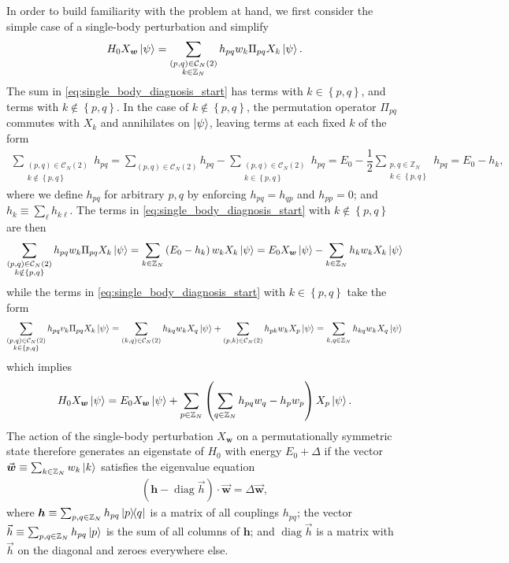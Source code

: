 \documentclass[nofootinbib,notitlepage,11pt]{revtex4-2}
\newcommand{\f}[2]{\dfrac{#1}{#2}} %
\newcommand{\p}[1]{\left(#1\right)} %
\renewcommand{\set}[1]{\left\{#1\right\}} %
\renewcommand{\c}{\cdot} %
\newcommand{\m}{\bm} %
\renewcommand{\v}{\vec} %
\newcommand{\1}{\mathds{1}}
\newcommand{\C}{\mathcal{C}}
\newcommand{\ZZ}{\mathbb{Z}}
\DeclareMathOperator{\diag}{diag}
\begin{document}
In order to build familiarity with the problem at hand, we first
consider the simple case of a single-body perturbation and simplify
\begin{align}
  H_0 X_{\m w} \ket\psi
  = \sum_{\substack{\p{p,q}\in\C_N\p{2}\\k\in\ZZ_N}}
  h_{pq} w_k \Pi_{pq} X_k \ket\psi.
  \label{eq:single_body_diagnosis_start}
\end{align}
The sum in \eqref{eq:single_body_diagnosis_start} has terms with
$k\in\set{p,q}$, and terms with $k\notin\set{p,q}$.  In the case of
$k\notin\set{p,q}$, the permutation operator $\Pi_{pq}$ commutes with
$X_k$ and annihilates on $\ket\psi$, leaving terms at each fixed $k$
of the form
\begin{align}
  \sum_{\substack{\p{p,q}\in\C_N\p{2}\\k\notin\set{p,q}}} h_{pq}
  = \sum_{\p{p,q}\in\C_N\p{2}} h_{pq}
  - \sum_{\substack{\p{p,q}\in\C_N\p{2}\\k\in\set{p,q}}} h_{pq}
  = E_0 - \f12 \sum_{\substack{p,q\in\ZZ_N\\k\in\set{p,q}}} h_{pq}
  = E_0 - h_k,
\end{align}
where we define $h_{pq}$ for arbitrary $p,q$ by enforcing
$h_{pq}=h_{qp}$ and $h_{pp}=0$; and $h_k \equiv \sum_\ell h_{k\ell}$.
The terms in \eqref{eq:single_body_diagnosis_start} with
$k\notin\set{p,q}$ are then
\begin{align}
  \sum_{\substack{\p{p,q}\in\C_N\p{2}\\k\notin\set{p,q}}}
  h_{pq} w_k \Pi_{pq} X_k \ket\psi
  = \sum_{k\in\ZZ_N} \p{E_0 - h_k} w_k X_k \ket\psi
  = E_0 X_{\m w} \ket\psi - \sum_{k\in\ZZ_N} h_k w_k X_k \ket\psi
\end{align}
while the terms in \eqref{eq:single_body_diagnosis_start} with
$k\in\set{p,q}$ take the form
\begin{align}
  \sum_{\substack{\p{p,q}\in\C_N\p{2}\\k\in\set{p,q}}}
  h_{pq} v_k \Pi_{pq} X_k \ket\psi
  = \sum_{\p{k,q}\in\C_N\p{2}} h_{kq} w_k X_q \ket\psi
  + \sum_{\p{p,k}\in\C_N\p{2}} h_{pk} w_k X_p \ket\psi
  = \sum_{k,q\in\ZZ_N} h_{kq} w_k X_q \ket\psi
\end{align}
which implies
\begin{align}
  H_0 X_{\m w} \ket\psi
  = E_0 X_{\m w} \ket\psi
  + \sum_{p\in\ZZ_N} \p{\sum_{q\in\ZZ_N} h_{pq} w_q - h_p w_p}
  X_p \ket\psi.
  \label{eq:single_body_diagnosis_end}
\end{align}
The action of the single-body perturbation $X_{\m w}$ on a
permutationally symmetric state therefore generates an eigenstate of
$H_0$ with energy $E_0+\Delta$ if the vector
$\v{\m w}\equiv\sum_{k\in\ZZ_N} w_k \ket{k}$ satisfies the eigenvalue
equation
\begin{align}
  \p{\m h - \diag\v h} \c \v{\m w} = \Delta \v{\m w},
  \label{eq:single_body_eig}
\end{align}
where $\m h\equiv\sum_{p,q\in\ZZ_N} h_{pq} \op{p}{q}$ is a matrix of
all couplings $h_{pq}$; the vector
$\v h\equiv\sum_{p,q\in\ZZ_N} h_{pq} \ket{p}$ is the sum of all
columns of $\m h$; and $\diag\v h$ is a matrix with $\v h$ on the
diagonal and zeroes everywhere else.
\end{document}
